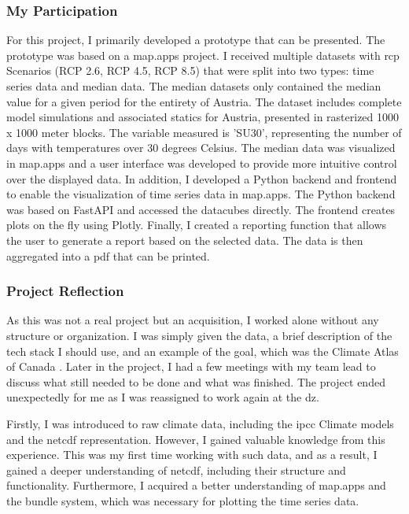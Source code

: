 \documentclass[11pt, titlepage, a4paper]{article}
\begin{document}
\subsubsection{My Participation}
For this project, I primarily developed a prototype that can be presented. The prototype was based on a map.apps project.    I received multiple datasets with \gls{rcp} Scenarios (RCP 2.6, RCP 4.5, RCP 8.5) \cite{intergovernmentalpanelonclimatechangeClimateChange2023} that were split into two types: time series data and median data. The median datasets only contained the median value for a given period for the entirety of Austria. The dataset includes complete model simulations and associated statics for Austria, presented in rasterized 1000 x 1000 meter blocks. The variable measured is 'SU30', representing the number of days with temperatures over 30 degrees Celsius.
The median data was visualized in map.apps and a user interface was developed to provide more intuitive control over the displayed data. In addition, I developed a Python backend and frontend to enable the visualization of time series data in map.apps. The Python backend was based on FastAPI and accessed the datacubes directly. The frontend creates plots on the fly using Plotly. Finally, I created a reporting function that allows the user to generate a report based on the selected data. The data is then aggregated into a \gls{pdf} that can be printed.

\subsubsection{Project Reflection}
As this was not a real project but an acquisition, I worked alone without any structure or organization.  I was simply given the data, a brief description of the tech stack I should use, and an example of the goal, which was the Climate Atlas of Canada \cite{ClimateAtlasCanada}. Later in the project, I had a few meetings with my team lead to discuss what still needed to be done and what was finished. The project ended unexpectedly for me as I was reassigned to work again at the \gls{dz}. 

Firstly, I was introduced to raw climate data, including the \gls{ipcc} Climate models and the \gls{netcdf} representation. However, I gained valuable knowledge from this experience. This was my first time working with such data, and as a result, I gained a deeper understanding of \gls{netcdf}, including their structure and functionality. Furthermore, I acquired a better understanding of map.apps and the bundle system, which was necessary for plotting the time series data.
\end{document}
